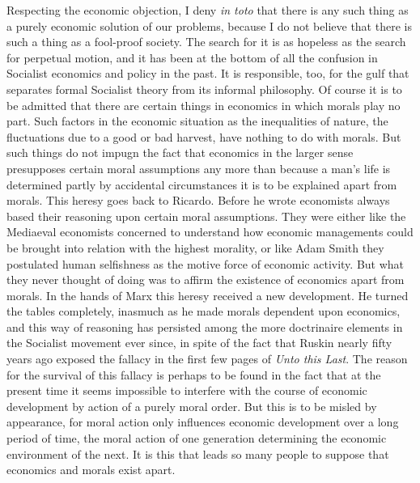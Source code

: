 \documentclass{book}
\begin{document}
Respecting the economic objection, I deny \emph{in toto} that there is any such thing as a purely economic solution of our problems, because I do not believe that there is such a thing as a fool-proof society. The search for it is as hopeless as the search for perpetual motion, and it has been at the bottom of all the confusion in Socialist economics and policy in the past. It is responsible, too, for the gulf that separates formal Socialist theory from its informal philosophy. Of course it is to be admitted that there are certain things in economics in which morals play no part. Such factors in the economic situation as the inequalities of nature, the fluctuations due to a good or bad harvest, have nothing to do with morals. But such things do not impugn the fact that economics in the larger sense presupposes certain moral assumptions any more than because a man’s life is determined partly by accidental circumstances it is to be explained apart from morals. This heresy goes back to Ricardo. Before he wrote economists always based their reasoning upon certain moral assumptions. They were either like the Mediaeval economists concerned to understand how economic managements could be brought into relation with the highest morality, or like Adam Smith they postulated human selfishness as the motive force of economic activity. But what they never thought of doing was to affirm the existence of economics apart from morals. In the hands of Marx this heresy received a new development. He turned the tables completely, inasmuch as he made morals dependent upon economics, and this way of reasoning has persisted among the more doctrinaire elements in the Socialist movement ever since, in spite of the fact that Ruskin nearly fifty years ago exposed the fallacy in the first few pages of \emph{Unto this Last}. The reason for the survival of this fallacy is perhaps to be found in the fact that at the present time it seems impossible to interfere with the course of economic development by action of a purely moral order. But this is to be misled by appearance, for moral action only influences economic development over a long period of time, the moral action of one generation determining the economic environment of the next. It is this that leads so many people to suppose that economics and morals exist apart.
\end{document}
